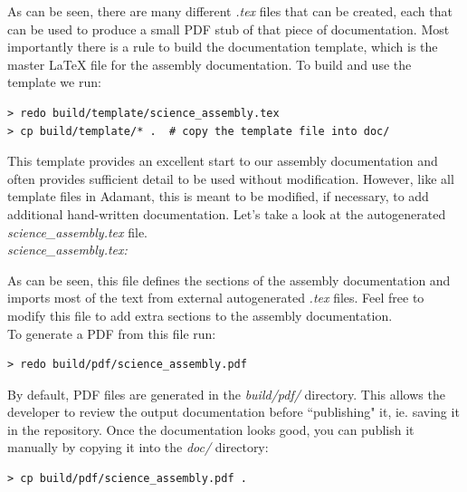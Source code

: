 As can be seen, there are many different \textit{.tex} files that can be created, each that can be used to produce a small PDF stub of that piece of documentation. Most importantly there is a rule to build the documentation template, which is the master \LaTeX{} file for the assembly documentation. To build and use the template we run:

\vspace{5mm} %
\begin{verbatim}
> redo build/template/science_assembly.tex
> cp build/template/* .  # copy the template file into doc/
\end{verbatim}
\vspace{5mm} %

This template provides an excellent start to our assembly documentation and often provides sufficient detail to be used without modification. However, like all template files in Adamant, this is meant to be modified, if necessary, to add additional hand-written documentation. Let's take a look at the autogenerated \textit{science\_assembly.tex} file. \\

\textit{science\_assembly.tex:}

As can be seen, this file defines the sections of the assembly documentation and imports most of the text from external autogenerated \textit{.tex} files. Feel free to modify this file to add extra sections to the assembly documentation. \\

To generate a PDF from this file run:

\vspace{5mm} %
\begin{verbatim}
> redo build/pdf/science_assembly.pdf
\end{verbatim}
\vspace{5mm} %

By default, PDF files are generated in the \textit{build/pdf/} directory. This allows the developer to review the output documentation before ``publishing" it, ie. saving it in the repository. Once the documentation looks good, you can publish it manually by copying it into the \textit{doc/} directory:

\vspace{5mm} %
\begin{verbatim}
> cp build/pdf/science_assembly.pdf .
\end{verbatim}
\vspace{5mm} %

